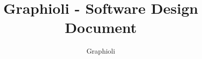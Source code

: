 \documentclass[a4paper]{scrartcl}
\author{Graphioli}
\title{Graphioli - Software Design Document}
\begin{document}
	
\setcounter{tocdepth}{5}
\setcounter{secnumdepth}{5}


\tableofcontents
\clearpage

\makeatletter
    \newcommand*{\textlabel}[2]{%
        \edef\@currentlabel{#1}%
        \phantomsection%
        #1\label{#2}%
    }
\makeatother

\newcommand{\graphioli}{\textsc{Graphioli}\xspace}







\end{document}
